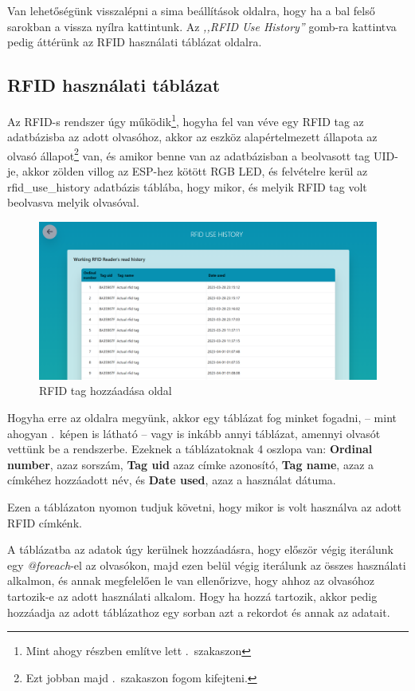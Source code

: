 \documentclass[
]{thesis-ekf}
\theoremstyle{definition}
\theoremstyle{remark}
\begin{document}
	Van lehetőségünk visszalépni a sima beállítások oldalra, hogy ha a bal felső sarokban a vissza nyílra kattintunk. Az \emph{,,RFID Use History''} gomb-ra kattintva pedig áttérünk az RFID használati táblázat oldalra.
	
	\subsection{RFID használati táblázat}
	Az RFID-s rendszer úgy működik\footnote{Mint ahogy részben említve lett .~szakaszon}, hogyha fel van véve egy RFID tag az adatbázisba az adott olvasóhoz, akkor az eszköz alapértelmezett állapota az olvasó állapot\footnote{Ezt jobban majd .~szakaszon fogom kifejteni.} van, és amikor benne van az adatbázisban a beolvasott tag UID-je, akkor zölden villog az ESP-hez kötött RGB LED, és felvételre kerül az rfid\_use\_history adatbázis táblába, hogy mikor, és melyik RFID tag volt beolvasva melyik olvasóval.

	\begin{figure}[ht!]
		\centering
		\includegraphics[width=1\textwidth]{./src/pages_img/rfid-use-history}
		\caption{RFID tag hozzáadása oldal}
		\label{rfid-use-history}
	\end{figure}
	
	Hogyha erre az oldalra megyünk, akkor egy táblázat fog minket fogadni, -- mint ahogyan .~képen is látható -- vagy is inkább annyi táblázat, amennyi olvasót vettünk be a rendszerbe. Ezeknek a táblázatoknak 4 oszlopa van: \textbf{Ordinal number}, azaz sorszám, \textbf{Tag uid} azaz címke azonosító, \textbf{Tag name}, azaz a címkéhez hozzáadott név, és \textbf{Date used}, azaz a használat dátuma.
	
	Ezen a táblázaton nyomon tudjuk követni, hogy mikor is volt használva az adott RFID címkénk.
	
	A táblázatba az adatok úgy kerülnek hozzáadásra, hogy először végig iterálunk egy \emph{@foreach}-el az olvasókon, majd ezen belül végig iterálunk az összes használati alkalmon, és annak megfelelően le van ellenőrizve, hogy ahhoz az olvasóhoz tartozik-e az adott használati alkalom. Hogy ha hozzá tartozik, akkor pedig hozzáadja az adott táblázathoz egy sorban azt a rekordot és annak az adatait.
	
\end{document}
